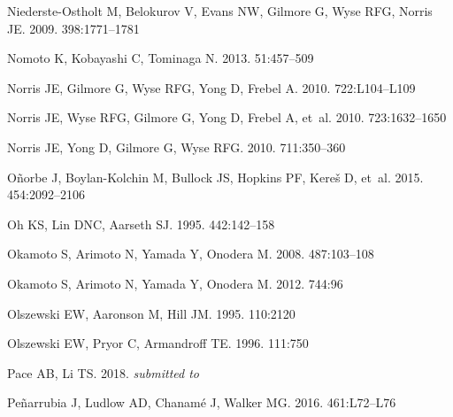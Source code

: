 \documentclass[a4paper]{ar-1col}
\begin{document}
\begin{thebibliography}{}
{Niederste-Ostholt} M, {Belokurov} V, {Evans} NW, {Gilmore} G, {Wyse} RFG,
  {Norris} JE. 2009.
\textit{\mnras} 398:1771--1781

{Nomoto} K, {Kobayashi} C, {Tominaga} N. 2013.
\textit{\araa} 51:457--509

{Norris} JE, {Gilmore} G, {Wyse} RFG, {Yong} D, {Frebel} A. 2010{}.
\textit{\apjl} 722:L104--L109

{Norris} JE, {Wyse} RFG, {Gilmore} G, {Yong} D, {Frebel} A, et~al.
  2010{}.
\textit{\apj} 723:1632--1650

{Norris} JE, {Yong} D, {Gilmore} G, {Wyse} RFG. 2010{}.
\textit{\apj} 711:350--360

{O{\~n}orbe} J, {Boylan-Kolchin} M, {Bullock} JS, {Hopkins} PF, {Kere{\v s}} D,
  et~al. 2015.
\textit{\mnras} 454:2092--2106

{Oh} KS, {Lin} DNC, {Aarseth} SJ. 1995.
\textit{\apj} 442:142--158

{Okamoto} S, {Arimoto} N, {Yamada} Y, {Onodera} M. 2008.
\textit{\aap} 487:103--108

{Okamoto} S, {Arimoto} N, {Yamada} Y, {Onodera} M. 2012.
\textit{\apj} 744:96

{Olszewski} EW, {Aaronson} M, {Hill} JM. 1995.
\textit{\aj} 110:2120

{Olszewski} EW, {Pryor} C, {Armandroff} TE. 1996.
\textit{\aj} 111:750

{Pace} AB, {Li} TS. 2018.
\textit{submitted to \apj}

{Pe{\~n}arrubia} J, {Ludlow} AD, {Chanam{\'e}} J, {Walker} MG. 2016.
\textit{\mnras} 461:L72--L76


\end{thebibliography}
\end{document}
